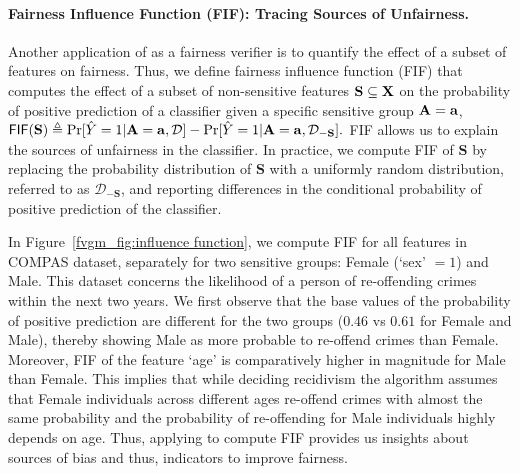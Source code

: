 \paragraph{Fairness Influence Function (FIF): Tracing Sources of Unfairness.}
Another application of \fvgm{} as a fairness verifier is to quantify the effect of a subset of features on fairness. Thus, we define fairness influence function (FIF)  that computes the effect of a subset of non-sensitive features $\mathbf{S} \subseteq \mathbf{X}$ on the probability of positive prediction of a classifier given a specific sensitive group $ \mathbf{A} = \mathbf{a}$,
$
	\mathsf{FIF}(\mathbf{S}) \triangleq \Pr[\hat{Y} = 1 | \mathbf{A} = \mathbf{a}, \mathcal{D}] - \Pr[\hat{Y} = 1 | \mathbf{A} = \mathbf{a},  \mathcal{D}_{-\mathbf{S}}].
$
FIF allows us to explain the sources of unfairness in the classifier. In practice, we compute FIF of $\mathbf{S}$ by replacing the probability distribution of $\mathbf{S}$ with a uniformly random distribution, referred to as  $ \mathcal{D}_{-\mathbf{S}} $, and reporting differences in the conditional probability of positive prediction of the classifier. 

In Figure~\ref{fvgm_fig:influence function}, we compute FIF for all features in COMPAS dataset, separately for two sensitive groups: Female (`sex' $ = 1 $) and Male. This dataset concerns the likelihood of a person of re-offending crimes within the next two years. We first observe that the base values of the probability of positive prediction are different for the two groups ($ 0.46 $ vs $ 0.61 $ for Female and Male), thereby showing Male as more probable to re-offend crimes than Female. Moreover, FIF of the feature `age' is comparatively higher in magnitude for Male than Female. 
This implies that while deciding recidivism the algorithm assumes that Female individuals across different ages re-offend crimes with almost the same probability and the probability of re-offending for Male individuals highly depends on age. Thus, applying {\fvgm} to compute FIF provides us insights about sources of bias and thus, indicators to improve fairness.

